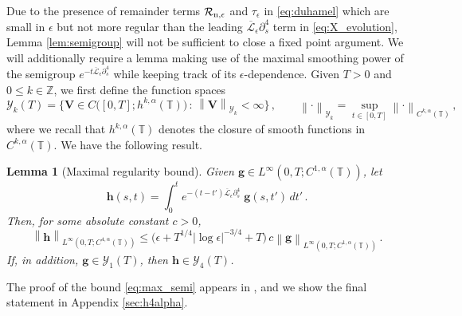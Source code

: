 \documentclass[11pt,reqno]{amsart}
\newcommand{\Z}{\mathbb{Z}}
\newcommand{\T}{\mathbb{T}}
\newcommand{\p}{\partial}
\newcommand{\abs}[1]{\left\lvert #1 \right\rvert}
\newcommand{\norm}[1]{\left\lVert #1 \right\rVert}
\newcommand{\mc}[1]{\mathcal{#1}}
\newtheorem{lemma}[theorem]{Lemma}
\theoremstyle{definition}
\begin{document}
Due to the presence of remainder terms $\mc{R}_{\rm n,\epsilon}$ and $\tau_\epsilon$ in \eqref{eq:duhamel} which are small in $\epsilon$ but not more regular than the leading $\overline{\mc{L}}_\epsilon\p_s^4$ term in \eqref{eq:X_evolution}, Lemma \ref{lem:semigroup} will not be sufficient to close a fixed point argument. We will additionally require a lemma making use of the maximal smoothing power of the semigroup $e^{-t\overline{\mc{L}}_\epsilon\p_s^4}$ while keeping track of its $\epsilon$-dependence. Given $T>0$ and $0\le k\in \Z$, we first define the function spaces 
\begin{equation}\label{eq:Ykspace_def}
\mc{Y}_k(T) = \big\{ \bm{V}\in C\big([0,T];h^{k,\alpha}(\T)\big)\,:\,\norm{\bm{V}}_{\mc{Y}_k}<\infty \big\}\,, \qquad \norm{\cdot}_{\mc{Y}_k}=\sup_{t\in [0,T]}\norm{\cdot}_{C^{k,\alpha}(\T)} \,,
\end{equation}
where we recall that $h^{k,\alpha}(\T)$ denotes the closure of smooth functions in $C^{k,\alpha}(\T)$.
We have the following result.
\begin{lemma}[Maximal regularity bound]\label{lem:max_reg}
Given $\bm{g}\in L^\infty(0,T; C^{1,\alpha}(\T))$, let
\begin{equation}
\bm{h}(s,t)= \int_0^t e^{-(t-t')\overline{\mc{L}}_\epsilon\p_s^4}\;\bm{g}(s,t')\,dt'\,.
\end{equation}
Then, for some absolute constant $c>0$,
\begin{equation}\label{eq:max_semi}
\norm{\bm{h}}_{L^\infty(0,T;C^{4,\alpha}(\T))} \le \big(\epsilon + T^{1/4}\abs{\log\epsilon}^{-3/4}+T \big)\,c\norm{\bm{g}}_{L^\infty(0,T;C^{1,\alpha}(\T))} \,.
\end{equation}
If, in addition, $\bm{g}\in \mc{Y}_1(T)$, then $\bm{h}\in \mc{Y}_4(T)$.
\end{lemma}
The proof of the bound \eqref{eq:max_semi} appears in \cite[Lemma 2.3]{ohm2024free}, and we show the final statement in Appendix \ref{sec:h4alpha}.
\end{document}

